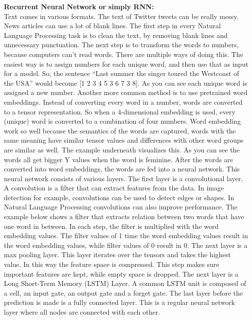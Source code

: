 \documentclass[12pt]{article}
\begin{document}
\textbf{Recurrent Neural Network or simply RNN:}\\
Text comes in various formats. The text of Twitter tweets can be really messy. News articles can use a lot of blank lines. The first step in every Natural Language Processing task is to clean the text, by removing blank lines and unnecessary punctuation.
The next step is to transform the words to numbers, because computers can’t read words. There are multiple ways of doing this. The easiest way is to assign numbers for each unique word, and then use that as input for a model. So, the sentence “Last summer the singer toured the Westcoast of the USA” would become [1 2 3 4 5 3 6 7 3 8]. As you can see each unique word is assigned a new number. Another more common method is to use pretrained word embeddings. Instead of converting every word in a number, words are converted to a tensor representation. So when a 4-dimensional embedding is used, every (unique) word is converted to a combination of four numbers. Word embedding work so well because the semantics of the words are captured, words with the same meaning have similar tensor values and differences with other word groups are similar as well. The example underneath visualizes this. As you can see the words all get bigger Y values when the word is feminine.
After the words are converted into word embeddings, the words are fed into a neural network. This neural network consists of various layers. The first layer is a convolutional layer. A convolution is a filter that can extract features from the data. In image detection for example, convolutions can be used to detect edges or shapes. In Natural Language Processing convolutions can also improve performance. The example below shows a filter that extracts relation between two words that have one word in between. In each step, the filter is multiplied with the word embedding values. The filter values of 1 time the word embedding values result in the word embedding values, while filter values of 0 result in 0.
The next layer is a max pooling layer. This layer iterates over the tensors and takes the highest value. In this way the feature space is compressed. This step makes sure important features are kept, while empty space is dropped.
The next layer is a Long Short-Term Memory (LSTM) Layer. A common LSTM unit is composed of a cell, an input gate, an output gate and a forget gate. The last layer before the prediction is made is a fully connected layer. This is a regular neural network layer where all nodes are connected with each other. \\
\end{document}
